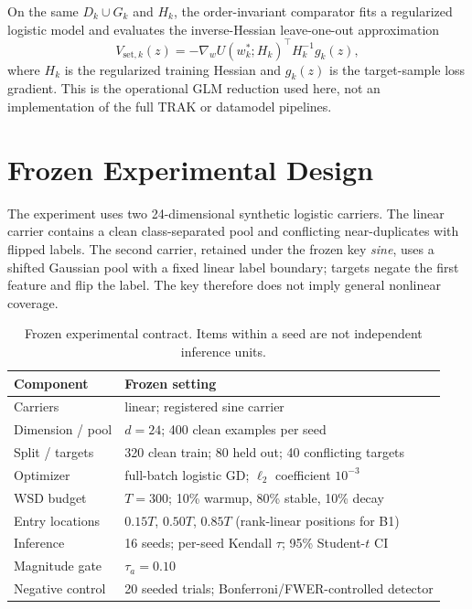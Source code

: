 \documentclass{article}
\begin{document}
On the same $D_k\cup G_k$ and $H_k$, the order-invariant comparator fits a regularized logistic
model and evaluates the inverse-Hessian leave-one-out approximation
\begin{equation}
V_{\mathrm{set},k}(z)=-\nabla_w U(w_k^*;H_k)^\top H_k^{-1}g_k(z),
\label{eq:set-value}
\end{equation}
where $H_k$ is the regularized training Hessian and $g_k(z)$ is the target-sample loss gradient.
This is the operational GLM reduction used here, not an implementation of the full TRAK or
datamodel pipelines.

\section{Frozen Experimental Design}
The experiment uses two 24-dimensional synthetic logistic carriers. The linear carrier contains a
clean class-separated pool and conflicting near-duplicates with flipped labels. The second carrier,
retained under the frozen key \emph{sine}, uses a shifted Gaussian pool with a fixed linear label
boundary; targets negate the first feature and flip the label. The key therefore does not imply
general nonlinear coverage.

\begin{table}[t]
\centering\small
\caption{Frozen experimental contract. Items within a seed are not independent inference units.}
\label{tab:contract}
\begin{tabularx}{\linewidth}{@{}lX@{}}
\toprule
Component & Frozen setting \\
\midrule
Carriers & linear; registered sine carrier \\
Dimension / pool & $d=24$; 400 clean examples per seed \\
Split / targets & 320 clean train; 80 held out; 40 conflicting targets \\
Optimizer & full-batch logistic GD; $\ell_2$ coefficient $10^{-3}$ \\
WSD budget & $T=300$; 10\% warmup, 80\% stable, 10\% decay \\
Entry locations & $0.15T$, $0.50T$, $0.85T$ (rank-linear positions for B1) \\
Inference & 16 seeds; per-seed Kendall $\tau$; 95\% Student-$t$ CI \\
Magnitude gate & $\tau_a=0.10$ \\
Negative control & 20 seeded trials; Bonferroni/FWER-controlled detector \\
\bottomrule
\end{tabularx}
\end{table}
\end{document}
